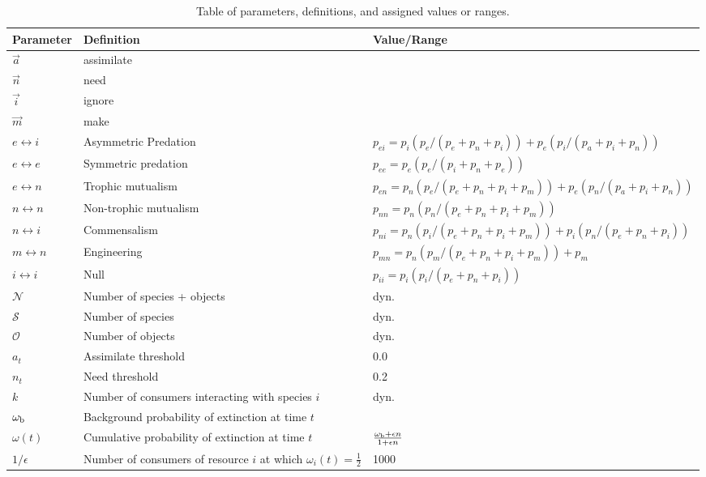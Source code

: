 \documentclass[twocolumn,preprintnumbers,amsmath,amssymb,superscriptaddress]{revtex4}
\begin{document}









\begin{table}[!t]
\begin{center}
\begin{tabular}{ l l l }
\hline
Parameter & Definition & Value/Range \\
\hline
$\overrightarrow{a}$ & assimilate & \\
$\overrightarrow{n}$ & need & \\
$\overrightarrow{i}$ & ignore & \\
$\overrightarrow{m}$ & make & \\
\hline
$e \leftrightarrow i$ & Asymmetric Predation & $p_{ei} = p_i(p_e/(p_e+p_n+p_i)) + p_e(p_i/(p_a+p_i+p_n))$ \\
$e \leftrightarrow e$ & Symmetric predation & $p_{ee} = p_e(p_e/(p_i+p_n+p_e))$\\
$e \leftrightarrow n$ & Trophic mutualism & $p_{en} = p_n(p_e/(p_e+p_n+p_i+p_m)) + p_e(p_n/(p_a+p_i+p_n))$ \\
$n \leftrightarrow n$ & Non-trophic mutualism & $p_{nn} = p_n(p_n/(p_e+p_n+p_i+p_m))$ \\
$n \leftrightarrow i$ & Commensalism & $p_{ni} = p_n(p_i/(p_e+p_n+p_i+p_m)) + p_i(p_n/(p_e+p_n+p_i))$\\
$m \leftrightarrow n$ & Engineering & $p_{mn} = p_n(p_m/(p_e+p_n+p_i+p_m)) + p_m$\\
$i \leftrightarrow i$ & Null & $p_{ii} = p_i(p_i/(p_e+p_n+p_i))$\\
\hline
$\mathcal{N}$ & Number of species + objects & dyn.\\
$\mathcal{S}$ & Number of species & dyn.\\
$\mathcal{O}$ & Number of objects & dyn.\\
$a_t$ & Assimilate threshold & 0.0\\
$n_t$ & Need threshold & 0.2\\
$k$ & Number of consumers interacting with species $i$ & dyn.\\
$\omega_{\rm b}$ & Background probability of extinction at time $t$\\
$\omega(t)$ & Cumulative probability of extinction at time $t$ & $\frac{\omega_{\rm b} + \epsilon n}{1 + \epsilon n}$\\
$1/\epsilon$ & Number of consumers of resource $i$ at which $\omega_i(t)=\frac{1}{2}$ & 1000\\
\hline
\end{tabular}
\end{center}
\caption{Table of parameters, definitions, and assigned values or ranges.}
\label{table:param}
\end{table}
\end{document}
